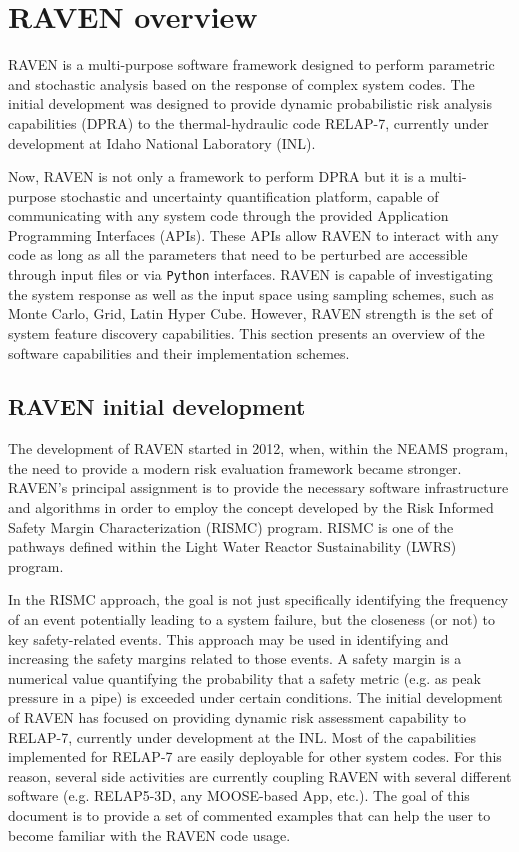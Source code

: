 \section{RAVEN overview}
RAVEN is a multi-purpose software framework designed to perform parametric and stochastic analysis based on the response of complex system codes. The initial development was designed to provide dynamic probabilistic risk analysis capabilities (DPRA) to the thermal-hydraulic code RELAP-7, currently under development
at Idaho National Laboratory (INL). 

Now, RAVEN is not only a framework to perform DPRA but it is a multi-purpose stochastic and uncertainty quantification platform, capable of communicating with any system code through the provided  Application Programming Interfaces (APIs). These APIs allow RAVEN to interact with any code as long as all the parameters that need to be perturbed are accessible through input files or via  \texttt{Python} interfaces. RAVEN is capable of investigating the system response as well as the input space using sampling schemes, such as Monte Carlo, Grid, Latin Hyper Cube. However, RAVEN strength is the set of system feature discovery capabilities. This section presents an overview of the software capabilities and their implementation schemes. 

\subsection{RAVEN initial development}
The development of RAVEN started in 2012, when, within the NEAMS program, the need to provide a modern risk evaluation framework became stronger. RAVEN’s principal assignment is to provide the necessary software infrastructure and algorithms in order to employ the concept developed by the Risk Informed Safety Margin Characterization (RISMC) program. RISMC is one of the pathways defined within the Light Water Reactor Sustainability (LWRS) program. 

In the RISMC approach, the goal is not just specifically identifying the frequency of an event potentially leading to a system failure, but the closeness (or not) to key safety-related events. This approach may be used in identifying and increasing the safety margins related to those events. A safety margin is a numerical value quantifying the probability that a safety metric (e.g. as peak pressure in a pipe) is exceeded under certain conditions.
The initial development of RAVEN has focused on providing dynamic risk assessment capability to RELAP-7, currently under development at the INL.
Most of the capabilities implemented for RELAP-7 are easily deployable for other system codes. For this reason, several side activities  are currently coupling RAVEN with several different software (e.g.  RELAP5-3D, any MOOSE-based App, etc.).
The goal of this document is to provide a set of commented examples that can help the user to become familiar 
with the RAVEN code usage.


